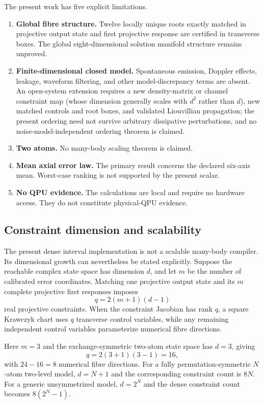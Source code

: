 The present work has five explicit limitations.
\begin{enumerate}[itemsep=0.15em]
\item \textbf{Global fibre structure.} Twelve locally unique roots exactly matched in
projective output state and first projective response are certified in transverse boxes.
The global eight-dimensional solution manifold structure remains unproved.
\item \textbf{Finite-dimensional closed model.} Spontaneous emission, Doppler effects,
leakage, waveform filtering, and other model-discrepancy terms are absent. An open-system
extension requires a new density-matrix or channel constraint map (whose dimension
generally scales with $d^{2}$ rather than $d$), new matched controls and root boxes, and
validated Liouvillian propagation; the present ordering need not survive arbitrary
dissipative perturbations, and no noise-model-independent ordering theorem is claimed.
\item \textbf{Two atoms.} No many-body scaling theorem is claimed.
\item \textbf{Mean axial error law.} The primary result concerns the declared six-axis
mean. Worst-case ranking is not supported by the present scalar.
\item \textbf{No QPU evidence.} The calculations are local and require no hardware access.
They do not constitute physical-QPU evidence.
\end{enumerate}

\subsection{Constraint dimension and scalability}

The present dense interval implementation is not a scalable many-body compiler. Its
dimensional growth can nevertheless be stated explicitly. Suppose the reachable complex
state space has dimension $d$, and let $m$ be the number of calibrated error coordinates.
Matching one projective output state and its $m$ complete projective first responses
imposes
\[
q=2(m+1)(d-1)
\]
real projective constraints. When the constraint Jacobian has rank $q$, a square Krawczyk
chart uses $q$ transverse control variables, while any remaining independent control
variables parameterize numerical fibre directions.

Here $m=3$ and the exchange-symmetric two-atom state space has $d=3$, giving
\[
q=2(3+1)(3-1)=16,
\]
with $24-16=8$ numerical fibre directions. For a fully permutation-symmetric $N$-atom
two-level model, $d=N+1$ and the corresponding constraint count is $8N$. For a generic
unsymmetrized model, $d=2^{N}$ and the dense constraint count becomes $8(2^{N}-1)$.

